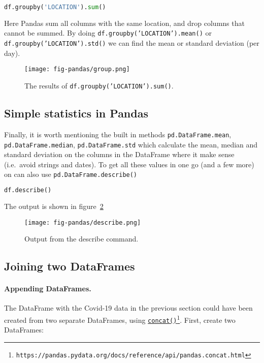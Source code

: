 \documentclass[graybox,sectrefs,envcountresetchap,open=right,final]{svmonodo}
\begin{document}
\begin{lstlisting}[language=python,style=blue1bar]
df.groupby('LOCATION').sum()

\end{lstlisting}

Here Pandas sum all columns with the same location, and drop columns that cannot be summed. By doing \texttt{df.groupby('LOCATION').mean()} or \texttt{df.groupby('LOCATION').std()} we can find the mean or standard deviation (per day).

\begin{figure}[!ht]  %
  \centerline{\texttt{[image: fig-pandas/group.png]}}
  \caption{
  The results of \texttt{df.groupby('LOCATION').sum()}. \label{fig:pandas:group}
  }
\end{figure}

\subsection{Simple statistics in Pandas}
Finally, it is worth mentioning the built in methods \texttt{pd.DataFrame.mean}, \texttt{pd.DataFrame.median}, \texttt{pd.DataFrame.std} which calculate the mean, median and standard deviation on the columns in the DataFrame where it make sense (i.e.~avoid strings and dates). To get all these values in one go (and a few more) on can also use \texttt{pd.DataFrame.describe()}


\begin{lstlisting}[language=python,style=blue1bar]
df.describe()

\end{lstlisting}

The output is shown in figure~\ref{fig:pandas:desc}

\begin{figure}[!ht]  %
  \centerline{\texttt{[image: fig-pandas/describe.png]}}
  \caption{
  Output from the describe command. \label{fig:pandas:desc}
  }
\end{figure}

\subsection{Joining two DataFrames}
\paragraph{Appending DataFrames.}
The DataFrame with the Covid-19 data in the previous section could have been created from two separate DataFrames, using \href{{https://pandas.pydata.org/docs/reference/api/pandas.concat.html}}{\nolinkurl{concat()}\footnote{\texttt{https://pandas.pydata.org/docs/reference/api/pandas.concat.html}}}. First, create two DataFrames: 
\end{document}

